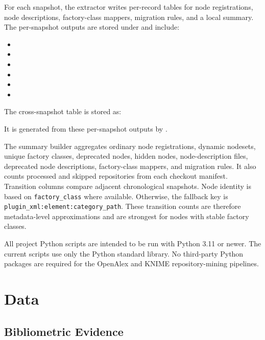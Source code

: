 \documentclass[runningheads]{llncs}
\begin{document}
For each snapshot, the extractor writes per-record tables for node
registrations, node descriptions, factory-class mappers, migration rules, and a
local summary. The per-snapshot outputs are stored under
and include:
\begin{itemize}
\item {}
\item {}
\item {}
\item {}
\item {}
\item {}
\end{itemize}
The cross-snapshot table is stored as:
\begin{quote}

\end{quote}
It is generated from these per-snapshot outputs by
.

The summary builder aggregates ordinary node registrations, dynamic nodesets,
unique factory classes, deprecated nodes, hidden nodes, node-description files,
deprecated node descriptions, factory-class mappers, and migration rules. It
also counts processed and skipped repositories from each checkout manifest.
Transition columns compare adjacent chronological snapshots. Node identity is
based on \texttt{factory\_class} where available. Otherwise, the fallback key
is \texttt{plugin\_xml:element:category\_path}. These transition counts are
therefore metadata-level approximations and are strongest for nodes with stable
factory classes.

All project Python scripts are intended to be run with Python 3.11 or newer.
The current scripts use only the Python standard library. No third-party
Python packages are required for the OpenAlex and KNIME repository-mining
pipelines.

\section{Data}

\subsection{Bibliometric Evidence}
\end{document}
